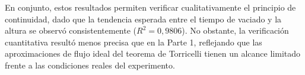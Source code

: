 En conjunto, estos resultados permiten verificar cualitativamente el
principio de continuidad, dado que la tendencia esperada entre el
tiempo de vaciado y la altura se observó consistentemente
($R^2 = 0{,}9806$). No obstante, la verificación cuantitativa resultó
menos precisa que en la Parte 1, reflejando que las aproximaciones de
flujo ideal del teorema de Torricelli tienen un alcance limitado
frente a las condiciones reales del experimento.

